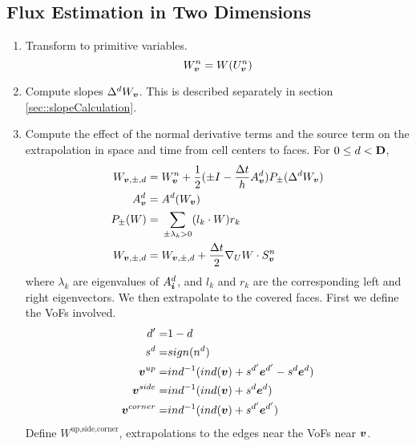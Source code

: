 \subsection{Flux Estimation in Two Dimensions}

\begin{enumerate}
\item Transform to primitive variables.  
\begin{equation}
W^n_{\boldsymbol{v}} = W(U^n_{\boldsymbol{v}})
\end{equation}

\item Compute slopes $\Delta^d W_{\boldsymbol{v}}$.  This is described
      separately in section \ref{sec::slopeCalculation}.

\item Compute the effect of the normal derivative terms and the source
term on the extrapolation in space and time from cell centers to
faces.  For $0 \le d < {\mathbf{D}}$,
\begin{align}
\begin{split}
W_{{\boldsymbol{v}}, \pm, d} = & \;
  W^n_{\boldsymbol{v}} +
  \frac{1}{2} (\pm I - \frac{\Delta t}{h} A^d_{\boldsymbol{v}}) P_\pm (\Delta^d W_{\boldsymbol{v}}) \\
A^d_{\boldsymbol{v}} = & \; A^d(W_{{\boldsymbol{v}}}) \\
P_\pm(W) = & \; \sum\limits_{\pm \lambda_k > 0} (l_k \cdot W) r_k \\
W_{{\boldsymbol{v}}, \pm, d} =  & \; W_{{\boldsymbol{v}}, \pm, d} + \frac{\Delta t}{2} \nabla_U W 
\cdot S^n_{\boldsymbol{v}} 
\end{split}
\label{eqn::normalPred}
\end{align}
where $\lambda_k$ are eigenvalues of $A^d_{\boldsymbol{i}}$, and 
$l_k$ and $r_k$ are the corresponding left and right eigenvectors.
We then extrapolate to the covered faces.   First we define the VoFs involved.
\begin{align}
\begin{split}
d' =&  1- d \\
s^d =& \sign{n^d} \\
\vbold^{up} =& ind^{-1}(ind(\vbold)+s^{d'}\ebold^{d'}- s^d \ebold^d)\\
\vbold^{side} =& ind^{-1}(ind(\vbold)+ s^d \ebold^d)\\
\vbold^{corner} =& ind^{-1}(ind(\vbold)+s^{d'}\ebold^{d'})
\end{split}
\label{eqn::vofloc2d}
\end{align}
Define $W^{\text{up,side,corner}}$, extrapolations to the edges near
the VoFs near  ${\boldsymbol{v}}$.   
\begin{align}

\end{align}
\end{enumerate}

